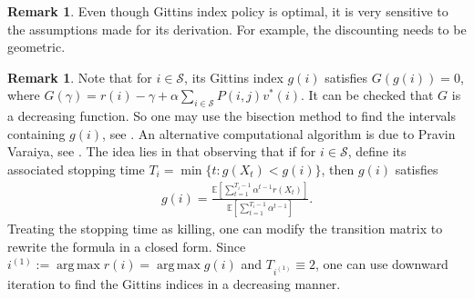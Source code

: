 \documentclass[letterpaper,11pt,openright,openany]{book}
\numberwithin{equation}{section}
\theoremstyle{plain}
\theoremstyle{definition}
\newtheorem{Rem}[Th]{Remark}
\def\E{{\mathbb E}}
\def\S{{\mathcal S}}
\DeclareMathOperator*{\argmax}{arg\,max}
\begin{document}
\begin{Rem}
Even though Gittins index policy is optimal, it is very sensitive to the assumptions made for its derivation. For example, the discounting needs to be geometric. 
\end{Rem}

\begin{Rem}
Note that for $i\in\S$, its Gittins index $g(i)$ satisfies $G(g(i))=0$, where $G(\gamma)=r(i)-\gamma+\alpha\sum_{i\in\S}P(i, j)v^*(i)$. It can be checked that $G$ is a decreasing function. 
So one may use the bisection method to find the intervals containing $g(i)$, see \cite{ben1990bisection}. 
An alternative computational algorithm is due to Pravin Varaiya, see \cite{Varaiya_1985}. 
The idea lies in that observing that if for $i\in\S$, define its associated stopping time $T_i = \min\{t: g(X_t)<g(i)\}$, then $g(i)$ satisfies
\begin{align*}
g(i) = \frac{\E\left[\sum_{t=1}^{T_i-1}\alpha^{t-1}r(X_t)\right]}{\E\left[\sum_{t=1}^{T_i-1}\alpha^{t-1}\right]}.
\end{align*}
Treating the stopping time as killing, one can modify the transition matrix to rewrite the formula in a closed form. Since $i^{(1)}:=\argmax r(i)=\argmax g(i)$ and $T_{i^{(1)}}\equiv 2$, one can use downward iteration to find the Gittins indices in a decreasing manner. 
\end{Rem}



\newpage

\printbibliography

 
 
\end{document}
